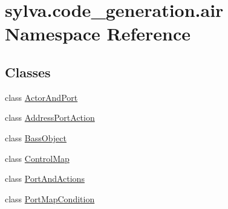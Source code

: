 \hypertarget{namespacesylva_1_1code__generation_1_1air}{}\section{sylva.\+code\+\_\+generation.\+air Namespace Reference}
\label{namespacesylva_1_1code__generation_1_1air}
\subsection*{Classes}
\begin{DoxyCompactItemize}
\item 
class \hyperlink{classsylva_1_1code__generation_1_1air_1_1_actor_and_port}{Actor\+And\+Port}
\item 
class \hyperlink{classsylva_1_1code__generation_1_1air_1_1_address_port_action}{Address\+Port\+Action}
\item 
class \hyperlink{classsylva_1_1code__generation_1_1air_1_1_bass_object}{Bass\+Object}
\item 
class \hyperlink{classsylva_1_1code__generation_1_1air_1_1_control_map}{Control\+Map}
\item 
class \hyperlink{classsylva_1_1code__generation_1_1air_1_1_port_and_actions}{Port\+And\+Actions}
\item 
class \hyperlink{classsylva_1_1code__generation_1_1air_1_1_port_map_condition}{Port\+Map\+Condition}
\end{DoxyCompactItemize}
